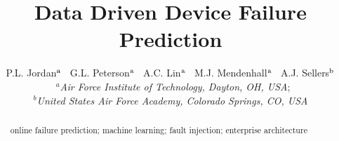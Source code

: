 \documentclass[]{tEIS2e}
\begin{document}

\title{Data Driven Device Failure Prediction}

\author{P.L. Jordan$^{\rm a}$ \
        G.L. Peterson$^{\rm a}$ \
        A.C. Lin$^{\rm a}$ \
        M.J. Mendenhall$^{\rm a}$ \
        A.J. Sellers$^{\rm b}$ \\\vspace{6pt} \
        $^{a}${\em{Air Force Institute of Technology, Dayton, OH, USA}}; \\
        $^{b}${\em{United States Air Force Academy, Colorado Springs, CO, USA}}}
  
\maketitle

\begin{abstract}


\begin{keywords}
online failure prediction; machine learning; fault injection; enterprise
architecture
\end{keywords}

\end{abstract}



 

\label{lastpage}
\end{document}
